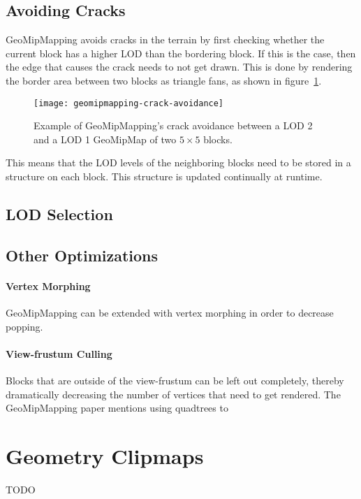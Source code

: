 \subsection{Avoiding Cracks}
GeoMipMapping avoids cracks in the terrain by first checking whether the
current block has a higher LOD than the bordering block.
If this is the case, then the edge that causes the crack 
needs to not get drawn. This is done by rendering the border area between two blocks
as triangle fans, as shown in figure~\ref{fig:geomipmapping-crack-avoidance}.

\begin{figure}[H]
  \centering
  \texttt{[image: geomipmapping-crack-avoidance]}
  \caption{Example of GeoMipMapping's crack avoidance between a LOD 2 and a LOD 1 GeoMipMap of two $5 \times 5$ blocks.}\label{fig:geomipmapping-crack-avoidance}
\end{figure}

This means that the LOD levels of the neighboring blocks need to be stored in a structure on each block.
This structure is updated continually at runtime.

\subsection{LOD Selection}

\subsection{Other Optimizations}
\paragraph{Vertex Morphing}
GeoMipMapping can be extended with vertex morphing in order to decrease popping.

\paragraph{View-frustum Culling}
Blocks that are outside of the view-frustum can be left out completely, thereby dramatically decreasing the number 
of vertices that need to get rendered.
The GeoMipMapping paper mentions using quadtrees to  


\section{Geometry Clipmaps}
TODO


